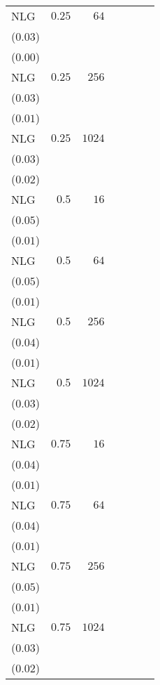 \begin{table*}[t]
\begin{tabular}{lrrrrrr}
NLG & \(0.25\) & \(64\) & \longcell{\(0.63\)\\{\tiny(\(0.03\))}} & \longcell{\(0.10\)\\{\tiny(\(0.00\))}} \\[2.2ex]
NLG & \(0.25\) & \(256\) & \longcell{\(0.81\)\\{\tiny(\(0.03\))}} & \longcell{\(0.13\)\\{\tiny(\(0.01\))}} \\[2.2ex]
NLG & \(0.25\) & \(1024\) & \longcell{\(0.86\)\\{\tiny(\(0.03\))}} & \longcell{\(0.14\)\\{\tiny(\(0.02\))}} \\[2.2ex]
NLG & \(0.5\) & \(16\) & \longcell{\(0.30\)\\{\tiny(\(0.05\))}} & \longcell{\(0.07\)\\{\tiny(\(0.01\))}} \\[2.2ex]
NLG & \(0.5\) & \(64\) & \longcell{\(0.54\)\\{\tiny(\(0.05\))}} & \longcell{\(0.10\)\\{\tiny(\(0.01\))}} \\[2.2ex]
NLG & \(0.5\) & \(256\) & \longcell{\(0.77\)\\{\tiny(\(0.04\))}} & \longcell{\(0.13\)\\{\tiny(\(0.01\))}} \\[2.2ex]
NLG & \(0.5\) & \(1024\) & \longcell{\(0.85\)\\{\tiny(\(0.03\))}} & \longcell{\(0.14\)\\{\tiny(\(0.02\))}} \\[2.2ex]
NLG & \(0.75\) & \(16\) & \longcell{\(0.22\)\\{\tiny(\(0.04\))}} & \longcell{\(0.06\)\\{\tiny(\(0.01\))}} \\[2.2ex]
NLG & \(0.75\) & \(64\) & \longcell{\(0.44\)\\{\tiny(\(0.04\))}} & \longcell{\(0.08\)\\{\tiny(\(0.01\))}} \\[2.2ex]
NLG & \(0.75\) & \(256\) & \longcell{\(0.66\)\\{\tiny(\(0.05\))}} & \longcell{\(0.11\)\\{\tiny(\(0.01\))}} \\[2.2ex]
NLG & \(0.75\) & \(1024\) & \longcell{\(0.80\)\\{\tiny(\(0.03\))}} & \longcell{\(0.14\)\\{\tiny(\(0.02\))}} \\[2.2ex]

\end{tabular}
\end{table*}

